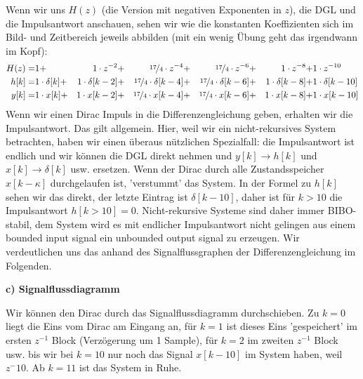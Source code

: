 \begin{ExCalc}
\begin{center}
\end{center}
%
Wenn wir uns $H(z)$ (die Version mit negativen Exponenten in $z$), die DGL und
die Impulsantwort anschauen, sehen wir wie die konstanten Koeffizienten
sich im Bild- und Zeitbereich jeweils abbilden (mit ein wenig Übung geht das
irgendwann im Kopf):
\begin{align}
H(z) =& 1 +& 1 \cdot z^{-2} +&& \nicefrac{17}{4} \cdot z^{-4}  +&& \nicefrac{17}{4} \cdot z^{-6} +&& 1 \cdot z^{-8} +& 1 \cdot z^{-10}\nonumber\\
h[k] =& 1 \cdot \delta[k] +& 1 \cdot \delta[k-2] +&& \nicefrac{17}{4} \cdot \delta[k-4] +&& \nicefrac{17}{4} \cdot \delta[k-6] +&& 1 \cdot \delta[k-8] +& 1 \cdot \delta[k-10]\nonumber\\
y[k] =& 1\cdot x[k] +& 1\cdot x[k-2] +&& \nicefrac{17}{4}\cdot x[k-4] +&& \nicefrac{17}{4}\cdot x[k-6] +&& 1\cdot x[k-8] +& 1\cdot x[k-10]
\end{align}
Wenn wir einen Dirac Impuls in die Differenzengleichung geben, erhalten wir
die Impulsantwort. Das gilt allgemein. Hier, weil wir ein nicht-rekursives
System betrachten, haben wir einen überaus nützlichen Spezialfall:
die Impulsantwort ist endlich und wir können die
DGL direkt nehmen und $y[k]\rightarrow h[k]$ und $x[k]\rightarrow \delta[k]$ usw.
ersetzen. Wenn der Dirac durch alle Zustandsspeicher
$x[k-\kappa]$ durchgelaufen ist, 'verstummt' das System.
%
In der Formel zu $h[k]$ sehen wir das direkt, der letzte Eintrag ist $\delta[k-10]$,
daher ist für $k>10$ die Impulsantwort $h[k>10]=0$.
%
Nicht-rekursive Systeme sind daher immer BIBO-stabil, dem System wird es mit
endlicher Impulsantwort nicht gelingen aus einem bounded input signal ein
unbounded output signal zu erzeugen.
%
Wir verdeutlichen uns das anhand
des Signalflussgraphen der Differenzengleichung im Folgenden.
%

\textbf{c) Signalflussdiagramm}

Wir können den Dirac durch das Signalflussdiagramm durchschieben.
Zu $k=0$ liegt die Eins vom Dirac am Eingang an, für $k=1$ ist dieses Eins
'gespeichert' im ersten $z^{-1}$ Block (Verzögerung um 1 Sample), für $k=2$ im zweiten $z^{-1}$ Block
usw. bis wir bei $k=10$ nur noch das Signal $x[k-10]$ im System haben, weil
$z^-10$. Ab $k=11$ ist das System in Ruhe.


\end{ExCalc}
